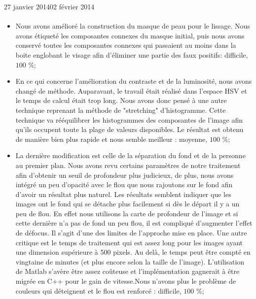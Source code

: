 \documentclass[11pt, french,screen]{report-rd-info}
\begin{document}
\begin{fichesuivi}{27 janvier 2014}{02 février 2014}
\paragraph{}
	\begin{travaileffectue}
		\begin{itemize}
			\item Nous avons amélioré la construction du masque de peau pour le lissage. Nous avons étiqueté les composantes connexes du masque initial, puis nous avons conservé toutes les composantes connexes qui passaient au moins dans la boite englobant le visage afin d'éliminer une partie des faux positifs: difficile, $100$ \%;
			\item En ce qui concerne l'amélioration du contraste et de la luminosité, nous avons changé de méthode. Auparavant, le travail était réalisé dans l'espace HSV et le temps de calcul était trop long. Nous avons donc pensé à une autre technique reprenant la méthode de "stretching" d'histogramme. Cette technique va rééquilibrer les histogrammes des composantes de l'image afin qu'ils occupent toute la plage de valeurs disponibles. Le résultat est obtenu de manière bien plus rapide et nous semble meilleur : moyenne, $100$ \%;
			\item La dernière modification est celle de la séparation du fond et de la personne au premier plan. Nous avons revu certains paramètres de notre traitement afin d'obtenir un seuil de profondeur plus judicieux, de plus, nous avons intégré un peu d'opacité avec le flou que nous rajoutons sur le fond afin d'avoir un résultat plus naturel. Les résultats semblent indiquer que les images ont le fond qui se détache plus facilement si dès le départ il y a un peu de flou. En effet nous utilisons la carte de profondeur de l'image et si cette dernière n'a pas de fond un peu flou, il est compliqué d'augmenter l'effet de défocus. Il s'agit d'une des limites de l'approche mise en place. Une autre critique est le temps de traitement qui est assez long pour les images ayant une dimension supérieure à 500 pixels. Au delà, le temps peut être compté en vingtaine de minutes (et plus encore selon la taille de l'image).
L'utilisation de Matlab s'avère être assez coûteuse et l'implémentation gagnerait à être migrée en C++ pour le gain de vitesse.Nous n'avons plus le problème de couleurs qui déteignent et le flou est renforcé : difficile, $100$ \%;
		\end{itemize}
	\end{travaileffectue}



\end{fichesuivi}
\end{document}

